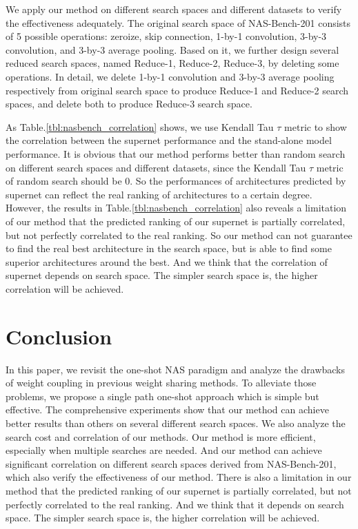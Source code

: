 We apply our method on different search spaces and different datasets to verify the effectiveness adequately. The original search space of NAS-Bench-201 consists of 5 possible operations: zeroize, skip connection, 1-by-1 convolution, 3-by-3 convolution, and 3-by-3 average pooling. Based on it, we further design several reduced search spaces, named Reduce-1, Reduce-2, Reduce-3, by deleting some operations. In detail, we delete 1-by-1 convolution and 3-by-3 average pooling respectively from original search space to produce Reduce-1 and Reduce-2 search spaces, and delete both to produce Reduce-3 search space. 

As Table.\ref{tbl:nasbench_correlation} shows, we use Kendall Tau $\tau$ metric to show the correlation between the supernet performance and the stand-alone model performance. It is obvious that our method performs better than random search on different search spaces and different datasets, since the Kendall Tau $\tau$ metric of random search should be 0. So the performances of architectures predicted by supernet can reflect the real ranking of architectures to a certain degree. However, the results in Table.\ref{tbl:nasbench_correlation} also reveals a limitation of our method that the predicted ranking of our supernet is partially correlated, but not perfectly correlated to the real ranking. So our method can not guarantee to find the real best architecture in the search space, but is able to find some superior architectures around the best. And we think that the correlation of supernet depends on search space. The simpler search space is, the higher correlation will be achieved.

\section{Conclusion}
\label{sec:conclusion}
In this paper, we revisit the one-shot NAS paradigm and analyze the drawbacks of weight coupling in previous weight sharing methods. To alleviate those problems, we propose a single path one-shot approach which is simple but effective. The comprehensive experiments show that our method can achieve better results than others on several different search spaces. We also analyze the search cost and correlation of our methods. Our method is more efficient, especially when multiple searches are needed. And our method can achieve significant correlation on different search spaces derived from NAS-Bench-201, which also verify the effectiveness of our method. There is also a limitation in our method that the predicted ranking of our supernet is partially correlated, but not perfectly correlated to the real ranking. And we think that it depends on search space. The simpler search space is, the higher correlation will be achieved.


